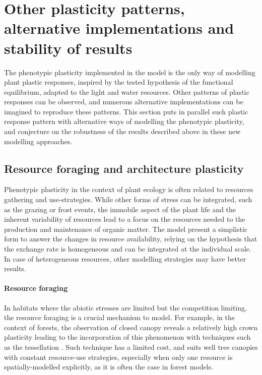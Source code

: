 \section{Other plasticity patterns, alternative implementations and stability of results}


The phenotypic plasticity implemented in the model \model is the only way of modelling plant plastic responses, inspired by the tested hypothesis of the functional equilibrium, adapted to the light and water resources. Other patterns of plastic responses can be observed, and numerous alternative implementations can be imagined to reproduce these patterns. This section puts in parallel such plastic response pattern with alternative ways of modelling the phenotypic plasticity, and conjecture on the robustness of the results described above in these new modelling approaches.


\subsection{Resource foraging and architecture plasticity}

Phenotypic plasticity in the context of plant ecology is often related to resources gathering and use-strategies. While other forms of stress can be integrated, such as the grazing or frost events, the immobile aspect of the plant life and the inherent variability of resources lead to a focus on the resources needed to the production and maintenance of organic matter. The model \model present a simplistic form to answer the changes in resource availability, relying on the hypothesis that the exchange rate is homogeneous and can be integrated at the individual scale. In case of heterogeneous resources, other modelling strategies may have better results.

\paragraph{Resource foraging}

In habitats where the abiotic stresses are limited but the competition limiting, the resource foraging is a crucial mechanism to model. For example, in the context of forests, the observation of closed canopy reveals a relatively high crown plasticity leading to the incorporation of this phenomenon with techniques such as the tessellation \parencite{berger_competition_2008}. Such technique has a limited cost, and suits well tree canopies with constant resource-use strategies, especially when only one resource is spatially-modelled explicitly, as it is often the case in forest models. 

